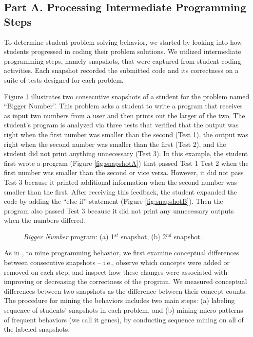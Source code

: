 \documentclass{sigchi}
\begin{document}
\subsection{Part A. Processing Intermediate Programming Steps}

To determine student problem-solving behavior, we started by looking into how students progressed in coding their problem solutions. We utilized intermediate programming steps, namely snapshots, that were captured from student coding activities. Each snapshot recorded the submitted code and its correctness on a suite of tests designed for each problem.

Figure \ref{fig:snapshotAB} illustrates two consecutive snapshots of a student for the problem named ``Bigger Number''. This problem asks a student to write a program that receives as input two numbers from a user and then prints out the larger of the two. The student's program is analyzed via three tests that verified that the output was right when the first number was smaller than the second (Test 1), the output was right when the second number was smaller than the first (Test 2), and the student did not print anything unnecessary (Test 3). In this example, the student first wrote a program (Figure \ref{fig:snapshotA}) that passed Test 1 Test 2 when the first number was smaller than the second or vice versa. However, it did not pass Test 3 because it printed additional information when the second number was smaller than the first. After receiving this feedback, the student expanded the code by adding the ``else if'' statement (Figure \ref{fig:snapshotB}). Then the program also passed Test 3 because it did not print any unnecessary outputs when the numbers differed.

\begin{figure}[thb]
\centering
{}
\quad
{}
%
\caption{\textit{Bigger Number} program: (a) 1$^{st}$ snapshot, (b) 2$^{nd}$ snapshot.}%
\label{fig:snapshotAB}
\end{figure}

As in \cite{Hosseini2014Psychology}, to mine programming behavior, we first examine conceptual differences between consecutive snapshots -- i.e., observe which concepts were added or removed on each step, and inspect how these changes were associated with improving or decreasing the correctness of the program. We measured conceptual differences between two snapshots as the difference between their concept counts. The procedure for mining the behaviors includes two main steps: (a) labeling sequence of students' snapshots in each problem, and (b) mining micro-patterns of frequent behaviors (we call it genes), by conducting sequence mining on all of the labeled snapshots.
\end{document}
